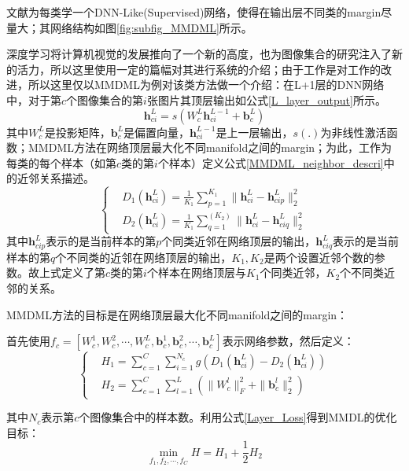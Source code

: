 文献\cite{Deeplearning_MMDML}为每类学一个DNN-Like(Supervised)网络，使得在输出层不同类的margin尽量大；其网络结构如图\ref{fig:subfig_MMDML}所示。

深度学习将计算机视觉的发展推向了一个新的高度，也为图像集合的研究注入了新的活力，所以这里使用一定的篇幅对其进行系统的介绍；由于工作\cite{Deeplearning_MMDML}是对工作\cite{Deeplearning_DRM}的改进，所以这里仅以MMDML\cite{Deeplearning_MMDML}为例对该类方法做一个介绍：在L+1层的DNN网络中，对于第$c$个图像集合的第$i$张图片其顶层输出如公式\ref{L_layer_output}所示。
\begin{equation}
\label{L_layer_output}
\bm{h}_{ci}^{L}=s(W_{c}^{L}\bm{h}_{ci}^{L-1}+\bm{b}_{c}^{L})
\end{equation}
其中$W_c^L$是投影矩阵，$\bm{b}_c^L$是偏置向量，$\bm{h}_{ci}^{L-1}$是上一层输出，$s(.)$为非线性激活函数；MMDML\cite{Deeplearning_MMDML}方法在网络顶层最大化不同manifold之间的margin；为此，工作\cite{Deeplearning_MMDML}为每类的每个样本（如第$c$类的第$i$个样本）定义公式\ref{MMDML_neighbor_descri}中的近邻关系描述。
\begin{equation}
\label{MMDML_neighbor_descri}
\left\{
\begin{split}
&D_1 (\bm{h}_{ci}^L )=\frac{1}{K_1}\sum_{p=1}^{K_1}\|\bm{h}_{ci}^{L}-\bm{h}_{cip}^L\|_2^2\\
&D_2 (\bm{h}_{ci}^L )=\frac{1}{K_1}\sum_{q=1}^(K_2)\|\bm{h}_{ci}^L-\bm{h}_{ciq}^L\|_2^2 
\end{split}
\right.
\end{equation}
其中$\bm{h}_{cip}^L$表示的是当前样本的第$p$个同类近邻在网络顶层的输出，$\bm{h}_{ciq}^L$表示的是当前样本的第$q$个不同类的近邻在网络顶层的输出，$K_1,K_2$是两个设置近邻个数的参数。故上式定义了第$c$类的第$i$个样本在网络顶层与$K_1$个同类近邻，$K_2$个不同类近邻的关系。

MMDML方法的目标是在网络顶层最大化不同manifold之间的margin：

首先使用$f_c=[W_c^1,W_c^2,\cdots,W_c^L,\bm{b}_c^1,\bm{b}_c^2,\cdots,\bm{b}_c^L]$表示网络参数，然后定义：
\begin{equation}
\label{Layer_Loss}
\left\{
\begin{split}
&H_1=\sum_{c=1}^C\sum_{i=1}^{N_c}g(D_1(\bm{h}_{ci}^{L})-D_2(\bm{h}_{ci}^L))\\
&H_2=\sum_{c=1}^C\sum_{l=1}^L(\|W_{c}^{l}\|_{F}^{2}+\|\bm{b}_{c}^{l}\|_{2}^2)
\end{split}
\right.
\end{equation}

其中$N_c$表示第$c$个图像集合中的样本数。利用公式\ref{Layer_Loss}得到MMDL的优化目标：
\begin{displaymath}
\min_{f_1,f_2,\cdots,f_C }H= H_1+\frac{1}{2}H_2
\end{displaymath}


